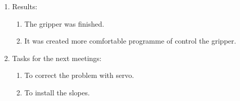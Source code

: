 \begin{enumerate}
\begin{enumerate}
    \end{enumerate}
    
	\item Results: 
	\begin{enumerate}
	  \item The gripper was finished.
	  
      \item It was created more comfortable programme of control the gripper.
      
    \end{enumerate}
    
	\item Tasks for the next meetings:
	\begin{enumerate}
	  \item To correct the problem with servo.
	  
	  \item To install the slopes.

    \end{enumerate}     
\end{enumerate}
\fillpage
